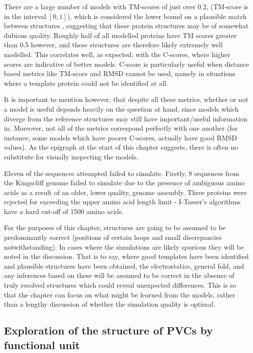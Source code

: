 There are a large number of models with TM-scores of just over 0.2, (TM-score is in the interval $[0,1]$), which is considered the lower bound on a plausible match between structures \citep{Zhang2005}, suggesting that these protein structures may be of somewhat dubious quality. Roughly half of all modelled proteins have TM scores greater than 0.5 however, and these structures are therefore likely extremely well modelled. This correlates well, as expected, with the C-scores, where higher scores are indicative of better models. C-score is particularly useful when distance based metrics like TM-score and RMSD cannot be used, namely in situations where a template protein could not be identified at all.

It is important to mention however, that despite all these metrics, whether or not a model is useful depends heavily on the question at hand, since models which diverge from the reference structures may still have important/useful information in. Moreover, not all of the metrics correspond perfectly with one another (for instance, some models which have poorer C-scores, actually have good RMSD values). As the epigraph at the start of this chapter suggests, there is often no substitute for visually inspecting the models.

Eleven of the sequences attempted failed to simulate. Firstly, 8 sequences from the \Pasy{} Kingscliff genome failed to simulate due to the presence of ambiguous amino acids as a result of an older, lower quality, genome assembly. Three proteins were rejected for exceeding the upper amino acid length limit - I-Tasser's algorithms have a hard cut-off of 1500 amino acids. 

For the purposes of this chapter, structures are going to be assumed to be predominantly correct (positions of certain loops and small discrepancies notwithstanding). In cases where the simulations are likely spurious they will be noted in the discussion. That is to say, where good templates have been identified and plausible structures have been obtained, the electrostatics, general fold, and any inferences based on these will be assumed to be correct in the absence of truly resolved structures which could reveal unexpected differences. This is so that the chapter can focus on what might be learned from the models, rather than a lengthy discussion of whether the simulation quality is optimal.

\clearpage
\subsection{Exploration of the structure of PVCs by functional unit}

